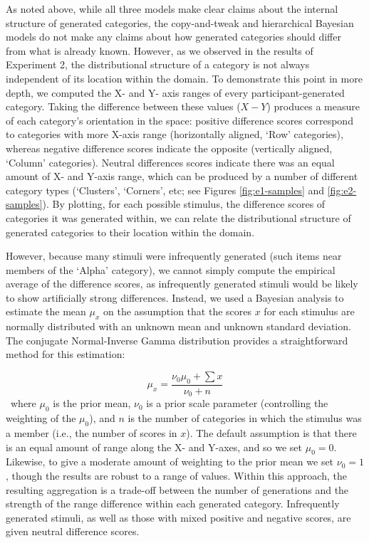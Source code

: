 \documentclass[12pt]{article}
\begin{document}
\begin{flushleft}
As noted above, while all three models make clear claims about the internal structure of generated categories, the copy-and-tweak and hierarchical Bayesian models do not make any claims about how generated categories should differ from what is already known. However, as we observed in the results of Experiment 2, the distributional structure of a category is not always independent of its location within the domain. To demonstrate this point in more depth, we computed the X- and Y- axis ranges of every participant-generated category. Taking the difference between these values ($X-Y$) produces a measure of each category's orientation in the space: positive difference scores correspond to categories with more X-axis range (horizontally aligned, `Row' categories), whereas negative difference scores indicate the opposite (vertically aligned, `Column' categories). Neutral differences scores indicate there was an equal amount of X- and Y-axis range, which can be produced by a number of different category types (`Clusters', `Corners', etc; see Figures \ref{fig:e1-samples} and \ref{fig:e2-samples}). By plotting, for each possible stimulus, the difference scores of categories it was generated within, we can relate the distributional structure of generated categories to their location within the domain.

However, because many stimuli were infrequently generated (such items near members of the `Alpha' category), we cannot simply compute the empirical average of the difference scores, as infrequently generated stimuli would be likely to show artificially strong differences. Instead, we used a Bayesian analysis to estimate the mean $\mu_x$ on the assumption that the scores $x$ for each stimulus are normally distributed with an unknown mean and unknown standard deviation. The conjugate Normal-Inverse Gamma distribution provides a straightforward method for this estimation:


\begin{equation}
\mu_x = \dfrac
    { \nu_0 \mu_0 + \sum{x} } 
    { \nu_0 + n }
\label{eq:rangediff-bayes}
\end{equation}
\
where $\mu_0$ is the prior mean, $\nu_0$ is a prior scale parameter (controlling the weighting of the $\mu_0$), and $n$ is the number of categories in which the stimulus was a member (i.e., the number of scores in $x$). The default assumption is that there is an equal amount of range along the X- and Y-axes, and so we set $\mu_0 = 0$. Likewise, to give a moderate amount of weighting to the prior mean we set $\nu_0 = 1$, though the results are robust to a range of values. Within this approach, the resulting aggregation is a trade-off between the number of generations and the strength of the range difference within each generated category. Infrequently generated stimuli, as well as those with mixed positive and negative scores, are given neutral difference scores.


\end{flushleft}
\end{document}
